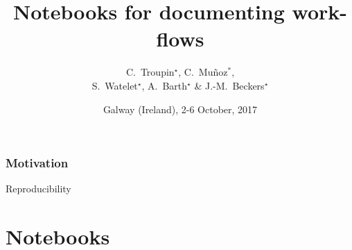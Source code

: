 

\title{Notebooks for documenting work-flows}
\author[C.~Troupin]{C.~Troupin$^{\star}$, C.~Muñoz$^{\ast}$,\\S.~Watelet$^{\star}$, A.~Barth$^{\star}$ \& J.-M.~Beckers$^{\star}$}


\date{Galway (Ireland), 2-6 October, 2017}



\begin{frame}
\maketitle
\end{frame}

\begin{frame}
\frametitle{Motivation}

Reproducibility

\end{frame}


\section{Notebooks}

